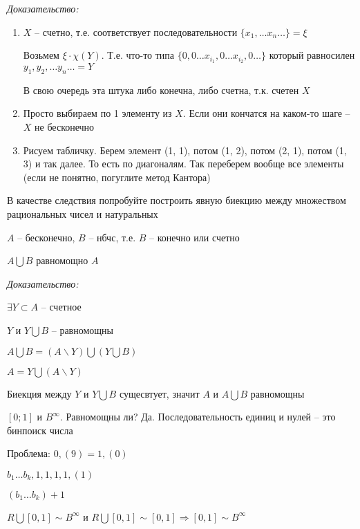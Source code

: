 \documentclass[12pt]{article}
\begin{document}
\textit{Доказательство:}

\begin{enumerate}
    \item $X$ -- счетно, т.е. соответствует последовательности $\{x_1, \ldots x_n \ldots\} = \xi$
    
    Возьмем $\xi \cdot \chi(Y)$. Т.е. что-то типа $\{ 0, 0 \ldots x_{i_1}, 0 \ldots x_{i_2}, 0 \ldots \}$ который равносилен $y_1, y_2, \ldots y_n \ldots = Y$

    В свою очередь эта штука либо конечна, либо счетна, т.к. счетен $X$

    \item Просто выбираем по 1 элементу из $X$. Если они кончатся на каком-то шаге -- $X$ не бесконечно
    
    \item Рисуем табличку. Берем элемент (1, 1), потом (1, 2), потом (2, 1), потом (1, 3) и так далее. То есть по диагоналям. Так переберем вообще все элементы (если не понятно, погуглите метод Кантора)
\end{enumerate}

\begin{Exercise}{}
    В качестве следствия попробуйте построить явную биекцию между множеством рациональных чисел и натуральных
\end{Exercise}

\begin{theo}{}
    $A$ -- бесконечно, $B$ -- нбчс, т.е. $B$ -- конечно или счетно

    $A \bigcup B$ равномощно $A$
\end{theo}

\textit{Доказательство:}

$\exists Y \subset A$ -- счетное

$Y$ и $Y \bigcup B$ -- равномощны

$A \bigcup B = (A \backslash Y) \bigcup (Y \bigcup B)$

$A = Y \bigcup (A \backslash Y)$

Биекция между $Y$ и $Y \bigcup B$ сущесвтует, значит $A$ и $A \bigcup B$ равномощны

\begin{Example}{}
    $[0; 1]$ и $B^\infty$. Равномощны ли? Да. Последовательность единиц и нулей -- это бинпоиск числа

    Проблема: $0,(9) = 1,(0)$

    $b_1 \ldots b_k, 1, 1, 1, 1, (1)$

    $(b_1 \ldots b_k) + 1$

    $R \bigcup [0, 1] \sim B^{\infty}$ и $R \bigcup [0, 1] \sim [0, 1] \Rightarrow [0, 1] \sim B^{\infty}$
\end{Example}
\end{document}
